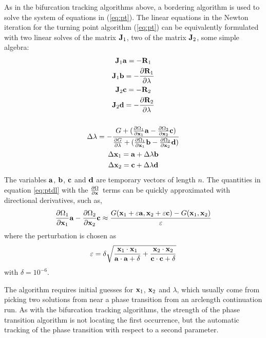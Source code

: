 As in the bifurcation tracking algorithms above, a bordering algorithm is used to solve the system of equations in (\ref{eq:pt}). The linear equations in the Newton iteration for the turning point algorithm (\ref{eq:pt}) can be equivalently formulated with two linear solves of the matrix ${\bf J}_1$, two of the matrix ${\bf J}_2$, some simple algebra:
\begin{gather}
{\bf J}_1 {\bf a} = -{\bf R}_1 \\
{\bf J}_1 {\bf b} = -\frac{\partial {\bf R}_1}{\partial \lambda} \\
{\bf J}_2 {\bf c} = -{\bf R}_2 \\
{\bf J}_2 {\bf d} = -\frac{\partial {\bf R}_2}{\partial \lambda} \\
\nonumber \\
\Delta\lambda = - {{G + (\frac{\partial \Omega_1}{\partial {\bf x}_1} {\bf a} - \frac{\partial \Omega_2}{\partial {\bf x}_2} {\bf c})} \over {\frac{\partial G}{\partial \lambda} + (\frac{\partial \Omega_1}{\partial  {\bf x}_1}  {\bf b}- \frac{\partial \Omega_2}{\partial  {\bf x}_2}  {\bf d})}} \label{eq:ptdl} \\
\Delta{\bf x}_1 = {\bf a} + \Delta\lambda {\bf b} \\
\Delta{\bf x}_2 = {\bf c} + \Delta\lambda {\bf d}
\end{gather}
The variables ${\bf a}$, ${\bf b}$, ${\bf c}$ and ${\bf d}$ are temporary vectors of length $n$. The quantities in equation \ref{eq:ptdl} with the $\frac{\partial \Omega}{\partial {\bf x}}$ terms can be quickly approximated with directional derivatives, such as,
\begin{equation}
\frac{\partial \Omega_1}{\partial {\bf x}_1} {\bf a} - \frac{\partial \Omega_2}{\partial {\bf x}_2} {\bf c} \approx 
{{G( {\bf x}_1 + \varepsilon  {\bf a},  {\bf x}_2 + \varepsilon  {\bf c}) - 
G( {\bf x}_1,  {\bf x}_2)} \over {\varepsilon}}
\end{equation}
where the perturbation is chosen as
\begin{equation}
\varepsilon = \delta \sqrt{ {{{\bf x}_1 \cdot {\bf x}_1}\over{ {\bf a}\cdot  {\bf a}+ \delta}}
+ {{{\bf x}_2 \cdot {\bf x}_2}\over{ {\bf c}\cdot  {\bf c}+ \delta}}}
\end{equation}
with $\delta=10^{-6}$.

The algorithm requires initial guesses for ${\bf x}_1$, ${\bf x}_2$ and $\lambda$, which usually come from picking two solutions from near a phase transition from an arclength continuation run. As with the bifurcation tracking algorithms, the strength of the phase transition algorithm is not locating the first occurrence, but the automatic tracking of the phase transition with respect to a second parameter.


